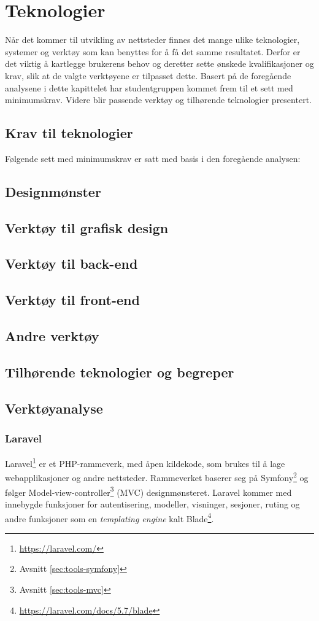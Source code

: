 \section{Teknologier}
Når det kommer til utvikling av nettsteder finnes det mange ulike teknologier, systemer og verktøy som kan benyttes for å få det samme resultatet. Derfor er det viktig å kartlegge brukerens behov og deretter sette ønskede kvalifikasjoner og krav, slik at de valgte verktøyene er tilpasset dette. Basert på de foregående analysene i dette kapittelet har studentgruppen kommet frem til et sett med minimumskrav. Videre blir passende verktøy og tilhørende teknologier presentert.

\subsection{Krav til teknologier}
Følgende sett med minimumskrav er satt med basis i den foregående analysen:


\subsection{Designmønster}
\subsection{Verktøy til grafisk design}
\subsection{Verktøy til back-end}
\subsection{Verktøy til front-end}
\subsection{Andre verktøy}
\subsection{Tilhørende teknologier og begreper}
\subsection{Verktøyanalyse}

\subsubsection{Laravel}
Laravel\footnote{\url{https://laravel.com/}} er et PHP-rammeverk, med åpen kildekode, som brukes til å lage webapplikasjoner og andre nettsteder. Rammeverket baserer seg på Symfony\footnote{Avsnitt \ref{sec:tools-symfony}} og følger Model-view-controller\footnote{Avsnitt \ref{sec:tools-mvc}} (MVC) designmønsteret.
Laravel kommer med innebygde funksjoner for autentisering, modeller, visninger, sesjoner, ruting og andre funksjoner som en \textit{templating engine} kalt Blade\footnote{\url{https://laravel.com/docs/5.7/blade}}.

